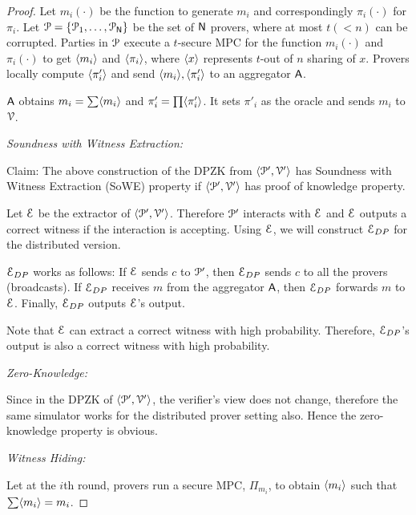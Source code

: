 \begin{proof}
	Let $m_i(\cdot)$ be the function to generate $m_i$ and correspondingly $\pi_i(\cdot)$ for $\pi_i$. Let $\mathcal{P} = \{\mathcal{P}_{1}, \ldots, \mathcal{P}_{\mathsf{N}}\}$ be the set of $\mathsf{N}$ provers, where at most $t (<n)$ can be corrupted. Parties in $\mathcal{P}$ execute a $t$-secure MPC for the function $m_i(\cdot)$ and $\pi_i(\cdot)$ to get $\langle m_i \rangle$ and $\langle \pi_i \rangle$, where $\langle x \rangle$ represents $t$-out of $n$ sharing of $x$. Provers locally compute $\langle \pi'_i \rangle$ and send $\langle m_i \rangle, \langle \pi'_i \rangle$ to an aggregator $\mathsf{A}$.
	
	$\mathsf{A}$ obtains $m_i = \sum \langle m_i \rangle$ and $\pi'_i = \prod \langle \pi'_i \rangle$. It sets $\pi'_i$ as the oracle and sends $m_i$ to $\mathcal{V}$.
	
	\textit{Soundness with Witness Extraction:}
	
	Claim: The above construction of the DPZK from $\langle \mathcal{P}', \mathcal{V}' \rangle$ has Soundness with Witness Extraction (SoWE) property if $\langle \mathcal{P}', \mathcal{V}' \rangle$ has proof of knowledge property. 
	
	Let $\mathcal{E}$ be the extractor of $\langle \mathcal{P}', \mathcal{V}' \rangle$. Therefore $\mathcal{P}'$ interacts with $\mathcal{E}$ and $\mathcal{E}$ outputs a correct witness if the interaction is accepting. Using $\mathcal{E}$, we will construct $\mathcal{E}_{DP}$ for the distributed version.
	
	$\mathcal{E}_{DP}$ works as follows:
	If $\mathcal{E}$ sends $c$ to $\mathcal{P}'$, then $\mathcal{E}_{DP}$ sends $c$ to all the provers (broadcasts).
	If $\mathcal{E}_{DP}$ receives $m$ from the aggregator $\mathsf{A}$, then $\mathcal{E}_{DP}$ forwards $m$ to $\mathcal{E}$. 
	Finally, $\mathcal{E}_{DP}$ outputs $\mathcal{E}$'s output.
	
	Note that $\mathcal{E}$ can extract a correct witness with high probability. Therefore, $\mathcal{E}_{DP}$'s output is also a correct witness with high probability.
	
	\textit{Zero-Knowledge:}
	
	Since in the DPZK of $\langle \mathcal{P}', \mathcal{V}' \rangle$, the verifier's view does not change, therefore the same simulator works for the distributed prover setting also. Hence the zero-knowledge property is obvious.
	
	\textit{Witness Hiding:} 
	
	Let at the $i$th round, provers run a secure MPC, $\Pi_{m_i}$, to obtain $\langle m_i \rangle$ such that $\sum \langle m_i \rangle = m_i$.
	

\end{proof}
